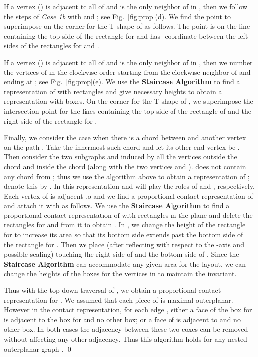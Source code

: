 \documentclass{llncs}
\begin{document}
	If a vertex  () is adjacent to all of  and is
	the only neighbor of  in , then we follow the steps of \textit{Case 1b} with 
	and ; see Fig.~\ref{fig:prop}(d).
 We find the point  to superimpose on
	the corner for the T-shape of  as follows. The point  is on the line
	containing the top side of the rectangle for  and has -coordinate between
	the left sides of the rectangles for  and .

	If a vertex  () is adjacent to all of  and is
	the only neighbor of  in , then we number the vertices of  in the clockwise
	order starting from the clockwise neighbor of  and ending at ;
	see Fig.~\ref{fig:prop}(e).
	 We use the
	\textbf{Staircase Algorithm} to find a representation of  with
	rectangles and give necessary heights to obtain a representation
	with boxes. On the corner for the T-shape of , we superimpose the
	intersection point for the lines containing the top side of the rectangle of  and the
	right side of the rectangle for .

	Finally, we consider the case when there is a chord between  and another vertex on the
	path . Take the innermost such chord and let its other end-vertex be . Then consider the two subgraphs 
	and  induced by all the vertices outside the chord and inside the chord (along with
	the two vertices  and ).  does not contain any chord from ;
	thus we use the algorithm above to obtain a
	representation of ; denote this by . In this
	representation  and  will play the roles of  and , respectively.
	Each vertex of  is adjacent to  and we find a proportional contact
	representation of  and attach it with  as follows. We use the \textbf{Staircase
	Algorithm} to find a proportional contact representation of  with rectangles in
	the plane and delete the rectangles for  and  from it to obtain .
	In , we change the height of the rectangle  for  to increase
	its area so that its bottom side extends past the bottom side of the rectangle 
	for . Then we place  (after reflecting with respect to the -axis
	and possible scaling) touching the right side of  and the bottom side of .
	Since the \textbf{Staircase Algorithm} can accommodate any given area for the layout,
	we can change the heights of the boxes for the vertices in  to maintain the invariant.
	
	
	Thus with the top-down traversal of , we obtain a proportional contact
	representation for . We assumed that each piece of  is maximal outerplanar.
	However in the contact representation, for each edge , either
	a face of the box  for  is adjacent to the box  for  and no other box;
	or a face of  is adjacent to  and no other box. In both cases the adjacency
	between these two coxes can be removed without affecting any other adjacency. Thus this
	algorithm holds for any nested outerplanar graph . \qed
\end{document}
